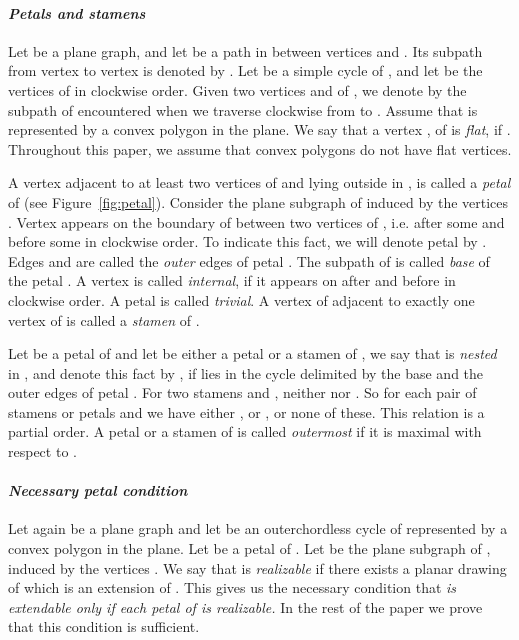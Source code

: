 \documentclass{llncs}
\begin{document}
\vspace{-0.3cm}
\paragraph{\emph{\bf Petals and stamens}}
Let  be a plane graph, and let  be 
a path in  between vertices  and . Its subpath from vertex  to vertex  is denoted by . 
Let  be a simple cycle of , and let  be the vertices of  in clockwise order. Given two vertices  and  of , 
we denote by  the subpath of  encountered when we traverse  clockwise from  to . Assume that  is represented by a convex polygon  in the plane.  We say that a vertex ,  of  is \emph{flat}, if . Throughout this paper, we assume that convex polygons do not have flat vertices.  

A vertex  adjacent to at least two vertices of  and lying outside  in , is called a \emph{petal} of  (see Figure~\ref{fig:petal}).  Consider the plane subgraph  of  induced by the vertices . Vertex  appears on the boundary of  between two vertices of , i.e. after some  and before some  in clockwise order. To indicate this fact, we will denote petal  by . Edges  and  are called the \emph{outer} edges of petal . The subpath  of  is called \emph{base} of the petal . A vertex  is called \emph{internal}, if it appears on  after  and before  in clockwise order.
A petal  is called \emph{trivial}. 
A vertex of  adjacent to exactly one vertex of  is called a \emph{stamen} of . 

Let  be a petal of  and let  be either a petal or a stamen of , we say that  is \emph{nested} in , and denote this fact by , if 
 lies in the cycle delimited by the base and the outer edges of petal .  
For two stamens  and , neither  nor .
So for each pair of stamens or petals  and  we have either , or , or none of these.
This relation  is a partial order. A petal or a stamen  of  is called \emph{outermost} if it is maximal with respect to .  

\paragraph{\emph{\bf Necessary petal condition}} Let again  be a plane graph and let  be an outerchordless cycle of  represented by a convex polygon  in the plane. Let  be a petal of . Let  be the plane subgraph of , induced by the vertices .  We
say that  is \emph{realizable} if there exists a planar drawing 
of  which is an extension of . 
This gives us the necessary condition that \emph{ is extendable only if each petal of  is realizable.} In the rest of the paper we prove that this condition is sufficient.
\end{document}
